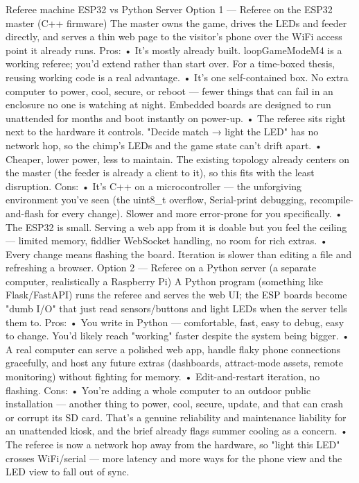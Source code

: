 Referee machine
ESP32 vs Python Server
Option 1 — Referee on the ESP32 master (C++ firmware)
The master owns the game, drives the LEDs and feeder directly, and serves a thin web page to the visitor's phone over the WiFi access point it already runs.
Pros:
•	It's mostly already built. loopGameModeM4 is a working referee; you'd extend rather than start over. For a time-boxed thesis, reusing working code is a real advantage.
•	It's one self-contained box. No extra computer to power, cool, secure, or reboot — fewer things that can fail in an enclosure no one is watching at night. Embedded boards are designed to run unattended for months and boot instantly on power-up.
•	The referee sits right next to the hardware it controls. "Decide match → light the LED" has no network hop, so the chimp's LEDs and the game state can't drift apart.
•	Cheaper, lower power, less to maintain. The existing topology already centers on the master (the feeder is already a client to it), so this fits with the least disruption.
Cons:
•	It's C++ on a microcontroller — the unforgiving environment you've seen (the uint8_t overflow, Serial-print debugging, recompile-and-flash for every change). Slower and more error-prone for you specifically.
•	The ESP32 is small. Serving a web app from it is doable but you feel the ceiling — limited memory, fiddlier WebSocket handling, no room for rich extras.
•	Every change means flashing the board. Iteration is slower than editing a file and refreshing a browser.
Option 2 — Referee on a Python server (a separate computer, realistically a Raspberry Pi)
A Python program (something like Flask/FastAPI) runs the referee and serves the web UI; the ESP boards become "dumb I/O" that just read sensors/buttons and light LEDs when the server tells them to.
Pros:
•	You write in Python — comfortable, fast, easy to debug, easy to change. You'd likely reach "working" faster despite the system being bigger.
•	A real computer can serve a polished web app, handle flaky phone connections gracefully, and host any future extras (dashboards, attract-mode assets, remote monitoring) without fighting for memory.
•	Edit-and-restart iteration, no flashing.
Cons:
•	You're adding a whole computer to an outdoor public installation — another thing to power, cool, secure, update, and that can crash or corrupt its SD card. That's a genuine reliability and maintenance liability for an unattended kiosk, and the brief already flags summer cooling as a concern.
•	The referee is now a network hop away from the hardware, so "light this LED" crosses WiFi/serial — more latency and more ways for the phone view and the LED view to fall out of sync.

